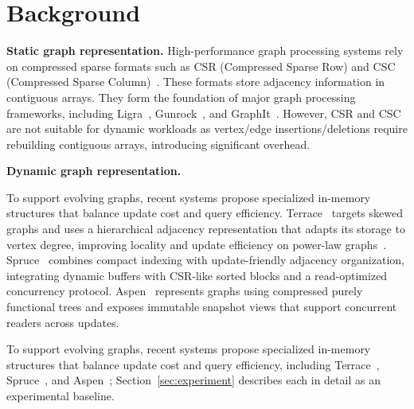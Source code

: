 \section{Background}
\label{sec:background}







\textbf{Static graph representation.}
High-performance graph processing systems rely on compressed
sparse formats such as CSR (Compressed Sparse Row) and CSC
(Compressed Sparse Column)~\cite{wheatman2018packed}.
These formats store adjacency information in contiguous arrays.
They form the foundation of major graph processing frameworks,
including Ligra~\cite{Shun2013Ligra},
Gunrock~\cite{Wang2016Gunrock}, and GraphIt~\cite{Zhang2018GraphIt}.
However, CSR and CSC are not suitable for dynamic workloads as vertex/edge insertions/deletions require rebuilding contiguous arrays, introducing significant overhead.

\textbf{Dynamic graph representation.}
\begin{maybecut}
To support evolving graphs, recent systems propose specialized
in-memory structures that balance update cost and query
efficiency.
Terrace~\cite{pandey2021terrace} targets skewed graphs and uses
a hierarchical adjacency representation that adapts its storage
to vertex degree, improving locality and update efficiency on
power-law graphs~\cite{barabasi1999emergence}.
Spruce~\cite{shi2024spruce} combines compact indexing with
update-friendly adjacency organization, integrating dynamic
buffers with CSR-like sorted blocks and a read-optimized
concurrency protocol.
Aspen~\cite{dhulipala2019low} represents graphs using
compressed purely functional trees and exposes immutable
snapshot views that support concurrent readers across updates.
\end{maybecut}
\begin{fixed}
To support evolving graphs, recent systems propose specialized
in-memory structures that balance update cost and query efficiency,
including Terrace~\cite{pandey2021terrace}, Spruce~\cite{shi2024spruce},
and Aspen~\cite{dhulipala2019low}; Section~\ref{sec:experiment} describes
each in detail as an experimental baseline.
\end{fixed}

